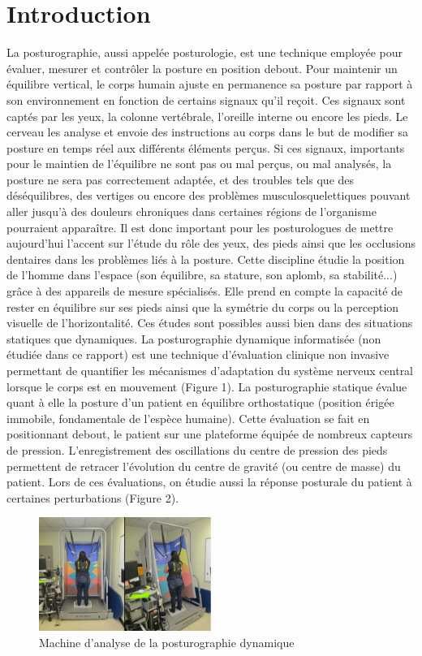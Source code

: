 \section{Introduction}

La posturographie, aussi appelée posturologie, est une technique employée pour évaluer, 
mesurer et contrôler la posture en position debout. Pour maintenir un équilibre vertical, 
le corps humain ajuste en permanence sa posture par rapport à son environnement en fonction de 
certains signaux qu'il reçoit. Ces signaux sont captés par les yeux, la colonne vertébrale, 
l’oreille interne ou encore les pieds. Le cerveau les analyse et envoie des instructions au 
corps dans le but de modifier sa posture en temps réel aux différents éléments perçus. Si ces 
signaux, importants pour le maintien de l'équilibre ne sont pas ou mal perçus, ou mal analysés,
la posture ne sera pas correctement adaptée, et des troubles tels que des déséquilibres, des 
vertiges ou encore des problèmes musculosquelettiques pouvant aller jusqu'à des douleurs 
chroniques dans certaines régions de l’organisme pourraient apparaître. Il est donc important 
pour les posturologues de mettre aujourd’hui l’accent sur l'étude du rôle des yeux, des pieds 
ainsi que les occlusions dentaires dans les problèmes liés à la posture. Cette discipline étudie
la position de l’homme dans l’espace (son équilibre, sa stature, son aplomb, sa stabilité...)
grâce à des appareils de mesure spécialisés. Elle prend en compte la capacité de rester en 
équilibre sur ses pieds ainsi que la symétrie du corps ou la perception visuelle de 
l'horizontalité. Ces études sont possibles aussi bien dans des situations statiques que 
dynamiques. La posturographie dynamique informatisée (non étudiée dans ce rapport) est une 
technique d’évaluation clinique non invasive permettant de quantifier les mécanismes
d’adaptation du système nerveux central lorsque le corps est en mouvement (Figure 1).  
La posturographie statique évalue quant à elle la posture d’un patient en équilibre
orthostatique (position érigée immobile, fondamentale de l'espèce humaine). Cette évaluation
se fait en positionnant debout, le patient sur une plateforme équipée de nombreux capteurs 
de pression. L’enregistrement des oscillations du centre de pression des pieds permettent 
de retracer l'évolution du centre de gravité (ou centre de masse) du patient. Lors de ces 
évaluations, on étudie aussi la réponse posturale du patient à certaines perturbations 
(Figure 2).


\begin{figure}[ht]
    \centering
    \includegraphics[width=0.5\textwidth]{images/introduction/dynamique.png}
    \caption{Machine d’analyse de la posturographie dynamique }
    \label{fig:posturographie-dynamique}
\end{figure}

